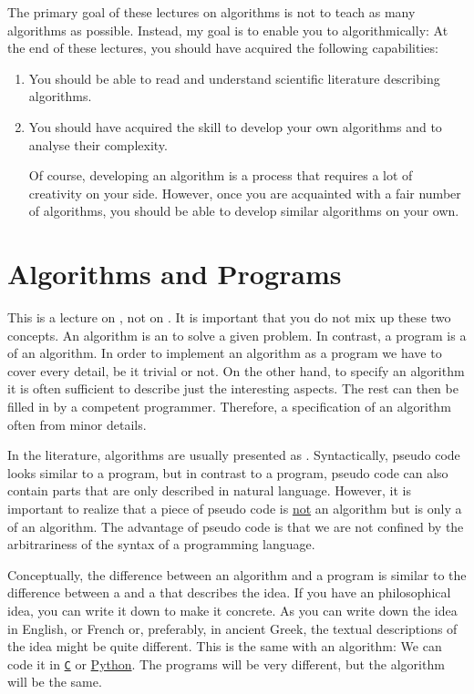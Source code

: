 The primary goal of these lectures on algorithms is not to teach as many algorithms as possible.
Instead, my goal is to enable you to  algorithmically:  At the end of these
lectures, you should have acquired the following capabilities:
\pagebreak
\begin{enumerate}
\item You should be able to read and understand scientific literature describing algorithms.
\item You should have acquired the skill to develop your own algorithms and to analyse their complexity.

      Of course, developing an algorithm is a process that requires a lot of creativity on your side.  However,
      once you are acquainted with a fair number of algorithms, you should be able to develop similar
      algorithms on your own. 
\end{enumerate}


\section{Algorithms and Programs}
This is a lecture on , not on .  It is important that you do not mix up
these two concepts.  An algorithm  is an  to solve a given problem.  In
contrast, a program is a  of an algorithm.  In order to implement an
algorithm as a program we have to cover every detail, be it trivial or not.  On the other hand, 
to specify an algorithm it is often sufficient to describe just the interesting aspects.  The rest can then be
filled in by a competent programmer.  Therefore, a specification of an algorithm often  from minor
details. 

In the literature, algorithms are usually presented as . 
Syntactically, pseudo code looks
similar to a program, but in contrast to a program, pseudo code can also contain parts that are only
described in natural language.   However, it is important to realize that a piece of pseudo code is
\underline{not} an algorithm but is only a  of an algorithm.  The
advantage of pseudo code is that we are not confined by the arbitrariness of the syntax of a
programming language.

Conceptually, the difference between an algorithm and a program is similar to the difference between
a  and a  that describes the idea.  If you have an philosophical idea, you
can write it down to make it concrete.  As you can write down the idea in English, or French or, preferably, in
ancient Greek, the textual descriptions of the idea might be quite different.  This is the same with an algorithm:
We can code it in \href{https://en.wikipedia.org/wiki/C_(programming_language)}{\texttt{C}} or
\href{http://python.org}{Python}.  The programs will be very different, but the algorithm will be the same. 

